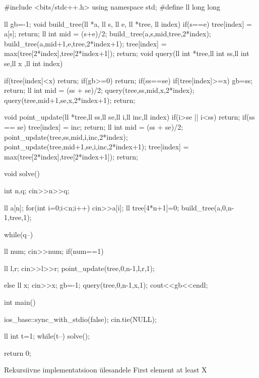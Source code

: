 \documentclass{trkut}
\theoremstyle{definition}
\begin{document}
\begin{cclol}
#include <bits/stdc++.h>
using namespace std;
#define ll long long

ll gb=-1;
void build_tree(ll *a, ll s, ll e, ll *tree, ll index)
{
	if(s==e)
	{
		tree[index] = a[s];
		return;
	}
	ll int mid = (s+e)/2;
	build_tree(a,s,mid,tree,2*index);
	build_tree(a,mid+1,e,tree,2*index+1);
	tree[index] = max(tree[2*index],tree[2*index+1]);
	return;
}
void query(ll int *tree,ll int ss,ll int se,ll x ,ll int index)
{
	
	if(tree[index]<x)
	return;
	if(gb>=0)
	return;
	if(ss==se)
	{
		if(tree[index]>=x)
		gb=ss;
		return;
	}
	ll int mid = (ss + se)/2;
	 query(tree,ss,mid,x,2*index);
	 query(tree,mid+1,se,x,2*index+1);
	 return;
}
void point_update(ll *tree,ll ss,ll se,ll i,ll inc,ll index)
{
	if(i>se || i<ss)
	return;
	if(ss == se)
	{
		tree[index] = inc;
		return;
	}
	ll int mid = (ss + se)/2;
	point_update(tree,ss,mid,i,inc,2*index);
	point_update(tree,mid+1,se,i,inc,2*index+1);
	tree[index] = max(tree[2*index],tree[2*index+1]);
	return;
}

void solve()
{
	int n,q;
	cin>>n>>q;
	
	ll a[n];
	for(int i=0;i<n;i++)
	cin>>a[i];
	ll tree[4*n+1]={0};
	build_tree(a,0,n-1,tree,1);

	while(q--)
	{
		ll num;
		cin>>num;
		if(num==1)
		{
			ll l,r;
			cin>>l>>r;
			point_update(tree,0,n-1,l,r,1);
			
		}
		else
		{
			ll x;
			cin>>x;
			gb=-1;
			query(tree,0,n-1,x,1);
			cout<<gb<<endl;
		}
		
	}

}
int main()
{
	ios_base::sync_with_stdio(false); 
    	cin.tie(NULL); 
  
    ll int t=1;
	while(t--)
	{  
      solve();
    }

	return 0;
}
\end{cclol}
\begin{kk}[H]%
    \caption{Rekursiivne implementatsioon ülesandele First element at least X}%
    \label{EMaxx}%
    \end{kk}
\end{document}
